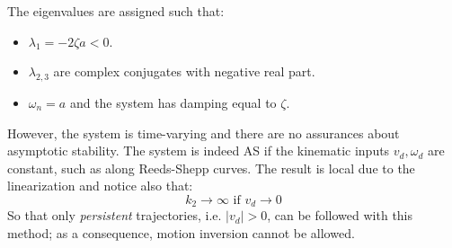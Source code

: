 The eigenvalues are assigned such that:
\begin{itemize}
    \item $\lambda_1=-2\zeta a<0$.
    \item $\lambda_{2,3}$ are complex conjugates with negative real part.
    \item $\omega_n=a$ and the system has damping equal to $\zeta$.
\end{itemize}
However, the system is time-varying and there are no assurances about asymptotic stability. The system is indeed AS if the kinematic inputs $v_d,\omega_d$ are constant, such as along Reeds-Shepp curves. The result is local due to the linearization and notice also that:
\begin{equation*}
    k_2 \rightarrow \infty \text{ if } v_d \rightarrow 0
\end{equation*}
So that only \textit{persistent} trajectories, i.e. $|v_d|>0$, can be followed with this method; as a consequence, motion inversion cannot be allowed.
